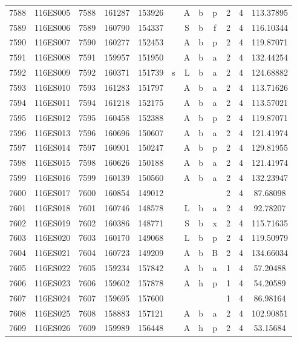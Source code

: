 \begin{tabular}{|*{12}{c|}}
7588 & 116ES005 & 7588 & 161287 & 153926 &  & A & b & p & 2 & 4 & 113.37895 \\ 
7589 & 116ES006 & 7589 & 160790 & 154337 &  & S & b & f & 2 & 4 & 116.10344 \\ 
7590 & 116ES007 & 7590 & 160277 & 152453 &  & A & b & p & 2 & 4 & 119.87071 \\ 
7591 & 116ES008 & 7591 & 159957 & 151950 &  & A & b & a & 2 & 4 & 132.44254 \\ 
7592 & 116ES009 & 7592 & 160371 & 151739 & s & L & b & a & 2 & 4 & 124.68882 \\ 
7593 & 116ES010 & 7593 & 161283 & 151797 &  & A & b & a & 2 & 4 & 113.71626 \\ 
7594 & 116ES011 & 7594 & 161218 & 152175 &  & A & b & a & 2 & 4 & 113.57021 \\ 
7595 & 116ES012 & 7595 & 160458 & 152388 &  & A & b & p & 2 & 4 & 119.87071 \\ 
7596 & 116ES013 & 7596 & 160696 & 150607 &  & A & b & a & 2 & 4 & 121.41974 \\ 
7597 & 116ES014 & 7597 & 160901 & 150247 &  & A & b & p & 2 & 4 & 129.81955 \\ 
7598 & 116ES015 & 7598 & 160626 & 150188 &  & A & b & a & 2 & 4 & 121.41974 \\ 
7599 & 116ES016 & 7599 & 160139 & 150560 &  & A & b & a & 2 & 4 & 132.23947 \\ 
7600 & 116ES017 & 7600 & 160854 & 149012 &  &  &  &  & 2 & 4 & 87.68098 \\ 
7601 & 116ES018 & 7601 & 160746 & 148578 &  & L & b & a & 2 & 4 & 92.78207 \\ 
7602 & 116ES019 & 7602 & 160386 & 148771 &  & S & b & x & 2 & 4 & 115.71635 \\ 
7603 & 116ES020 & 7603 & 160170 & 149068 &  & L & b & p & 2 & 4 & 119.50979 \\ 
7604 & 116ES021 & 7604 & 160723 & 149209 &  & A & b & B & 2 & 4 & 134.66034 \\ 
7605 & 116ES022 & 7605 & 159234 & 157842 &  & A & b & a & 1 & 4 & 57.20488 \\ 
7606 & 116ES023 & 7606 & 159602 & 157878 &  & A & h & p & 1 & 4 & 54.20589 \\ 
7607 & 116ES024 & 7607 & 159695 & 157600 &  &  &  &  & 1 & 4 & 86.98164 \\ 
7608 & 116ES025 & 7608 & 158883 & 157121 &  & A & b & a & 2 & 4 & 102.90851 \\ 
7609 & 116ES026 & 7609 & 159989 & 156448 &  & A & h & p & 2 & 4 & 53.15684 \\ 

\end{tabular}
